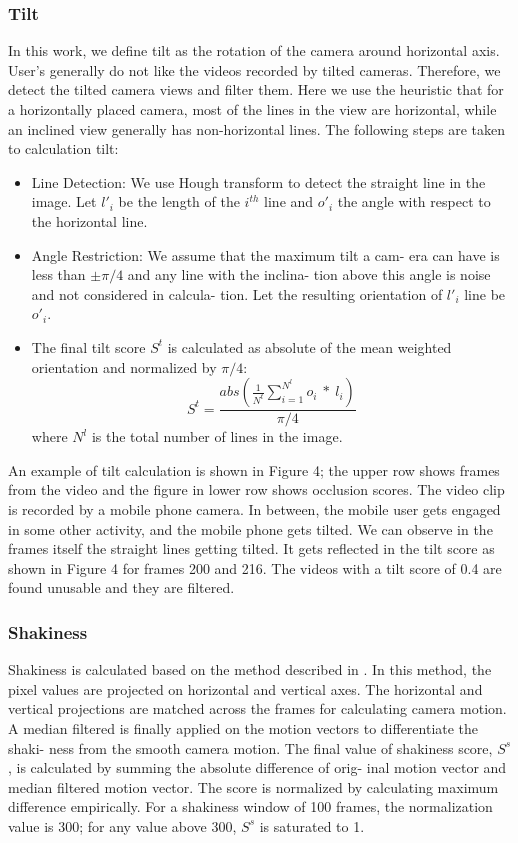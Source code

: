 \documentclass{sig-alternate}
\begin{document}
\subsubsection{Tilt}
In this work, we define tilt as the rotation of the camera around
horizontal axis. User’s generally do not like the videos recorded
by tilted cameras. Therefore, we detect the tilted camera views
and filter them. Here we use the heuristic that for a horizontally
placed camera, most of the lines in the view are horizontal, while
an inclined view generally has non-horizontal lines. The following
steps are taken to calculation tilt:
\begin{itemize}
    \item Line Detection: We use Hough transform to detect the straight
line in the image. Let $l'_i$ be the length of the $i^{th}$ line and $o'_i$ the angle with respect to the horizontal line.
    \item Angle Restriction: We assume that the maximum tilt a cam-
era can have is less than $ \pm \pi/4 $ and any line with the inclina-
tion above this angle is noise and not considered in calcula-
tion. Let the resulting orientation of $l'_i$ line be $o'_i$.
    \item The final tilt score $S^t$ is calculated as absolute of the mean
weighted orientation and normalized by $\pi/4 $:
\begin{equation}
S^t =  \frac{abs \left( \frac{1}{N^t} \sum_{i=1}^{N^l}o_i\ *\  l_i \right)}{\pi/4}
\end{equation}
where $N^l$ is the total number of lines in the image.
\end{itemize}
An example of tilt calculation is shown in Figure 4; the upper
row shows frames from the video and the figure in lower row shows
occlusion scores. The video clip is recorded by a mobile phone
camera. In between, the mobile user gets engaged in some other
activity, and the mobile phone gets tilted. We can observe in the
frames itself the straight lines getting tilted. It gets reflected in the
tilt score as shown in Figure 4 for frames 200 and 216. The videos
with a tilt score of 0.4 are found unusable and they are filtered.

\subsubsection{Shakiness}
Shakiness is calculated based on the method described in \cite{weda:spie}.
In this method, the pixel values are projected on horizontal and
vertical axes. The horizontal and vertical projections are matched
across the frames for calculating camera motion. A median filtered
is finally applied on the motion vectors to differentiate the shaki-
ness from the smooth camera motion. The final value of shakiness
score, $S^s$, is calculated by summing the absolute difference of orig-
inal motion vector and median filtered motion vector. The score is
normalized by calculating maximum difference empirically. For a
shakiness window of 100 frames, the normalization value is 300;
for any value above 300, $S^s$ is saturated to 1.
\end{document}
